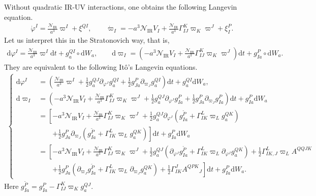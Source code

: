 \documentclass[aps, prd
, preprint
, nofootinbib 
, longbibliography
]{revtex4-1}
\newcommand{\dd}{\mathrm{d}}
\newcommand{\IR}{\mathrm{IR}}
\newcommand{\dps}{\displaystyle}
\newcommand{\calN}{\mathcal{N}}
\newcommand{\bae}[1]{\begin{align} #1 \end{align}}
\newcommand{\bce}[1]{\begin{cases} #1 \end{cases}}
\begin{document}
Without quadratic IR-UV interactions, one obtains the following Langevin equation.
\bae{
    \dot{\varphi}^I=\frac{\calN_\IR}{a^3}\varpi^I+\xi^{QI}, \qquad \dot{\varpi}_I=-a^3\calN_\IR V_I+\frac{\calN_\IR}{a^3}\Gamma^K_{IJ}\varpi_K\varpi^J+\xi^P_I.
}
Let us interpret this in the Stratonovich way, that is,
\bae{
    \dd\varphi^I=\frac{\calN_\IR}{a^3}\varpi^I\dd t+g^{QI}_a\circ\dd W_a, \qquad \dd\varpi_I=\left(-a^3\calN_\IR V_I+\frac{\calN_\IR}{a^3}\Gamma^K_{IJ}\varpi_K\varpi^J\right)\dd t+g^P_{Ia}\circ\dd W_a.
}
They are equivalent to the following It\^o's Langevin equations.
\bae{
    \bce{
        \dps
        \dd\varphi^I & 
        \dps
        =\left(\frac{\calN_\IR}{a^3}\varpi^I+\frac{1}{2}g^{QJ}_a\partial_{\varphi^J}g^{QI}_a+\frac{1}{2}g^P_{Ja}\partial_{\varpi_J}g^{QI}_a\right)\dd t+g^{QI}_a\dd W_a, \\
        \dps
        \dd\varpi_I &
        \dps
        =\left(-a^3\calN_\IR V_I+\frac{\calN_\IR}{a^3}\Gamma^K_{IJ}\varpi_K\varpi^J+\frac{1}{2}g^{QJ}_a\partial_{\varphi^J}g^P_{Ia}+\frac{1}{2}g^P_{Ja}\partial_{\varpi_J}g^P_{Ia}\right)\dd t+g^P_{Ia}\dd W_a \\
        & \dps
        =\left[-a^3\calN_\IR V_I+\frac{\calN_\IR}{a^3}\Gamma^K_{IJ}\varpi_K\varpi^J+\frac{1}{2}g^{QJ}_a\partial_{\varphi^J}\left(g^{\tilde{P}}_{Ia}+\Gamma_{IK}^L\varpi_Lg^{QK}_a\right) \right. \\
        & \dps \qquad
        \left.+\frac{1}{2}g^P_{Ja}\partial_{\varpi_J}\left(g^{\tilde{P}}_{Ia}+\Gamma^L_{IK}\varpi_Lg^{QK}_a\right)\right]\dd t+g^P_{Ia}\dd W_a \\
        & \dps 
        =\left[-a^3\calN_\IR V_I+\frac{\calN_\IR}{a^3}\Gamma^K_{IJ}\varpi_K\varpi^J+\frac{1}{2}g^{QJ}_a\left(\partial_{\varphi^J}g^{\tilde{P}}_{Ia}+\Gamma^L_{IK}\varpi_L\partial_{\varphi^J}g^{QK}_a\right)+\frac{1}{2}\Gamma^L_{IK,J}\varpi_LA^{QQJK} \right. \\
        & \dps \qquad
        \left.+\frac{1}{2}g^P_{Ja}\left(\partial_{\varpi_J}g^{\tilde{P}}_{Ia}+\Gamma^L_{IK}\varpi_L\partial_{\varpi_J}g^{QK}_a\right)+\frac{1}{2}\Gamma^J_{IK}A^{QPK}{}_J\right]\dd t+g^P_{Ia}\dd W_a.
    }
}
Here $g^{\tilde{P}}_{Ia}=g^P_{Ia}-\Gamma_{IJ}^K\varpi_Kg^{QJ}_a$.
\end{document}
